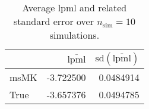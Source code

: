 \begin{table}[H]

\caption{Average lpml and related standard error over $n_{\text{sim}} = 10$ simulations.}
\centering
\begin{tabular}[t]{lrr}
\toprule
  & $\overbar{\text{lpml}}$ & $\text{sd}(\overbar{\text{lpml}})$\\
\midrule
msMK & -3.722500 & 0.0484914\\
True & -3.657376 & 0.0494785\\
\bottomrule
\end{tabular}
\end{table}